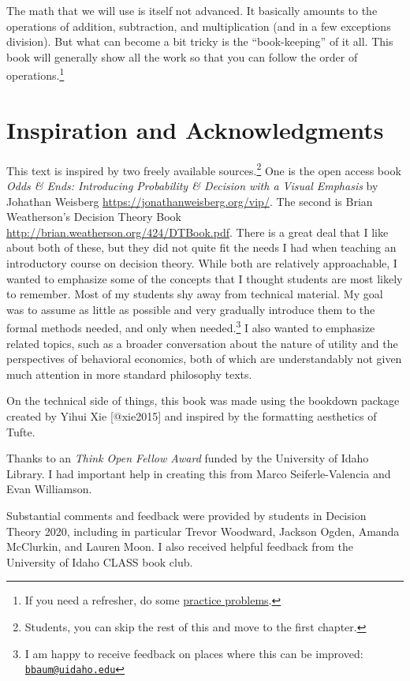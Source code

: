 \documentclass[]{tufte-book}
\begin{document}
The math that we will use is itself not advanced. It basically amounts to the operations of addition, subtraction, and multiplication (and in a few exceptions division). But what can become a bit tricky is the ``book-keeping'' of it all. This book will generally show all the work so that you can follow the order of operations.\footnote{If you need a refresher, do some \href{https://g.co/kgs/mhz72v}{practice problems}.}

\hypertarget{inspiration-and-acknowledgments}{%
\section{Inspiration and Acknowledgments}\label{inspiration-and-acknowledgments}}

This text is inspired by two freely available sources.\footnote{Students, you can skip the rest of this and move to the first chapter.} One is the open access book \emph{Odds \& Ends: Introducing Probability \& Decision with a Visual Emphasis} by Johathan Weisberg \url{https://jonathanweisberg.org/vip/}. The second is Brian Weatherson's Decision Theory Book \url{http://brian.weatherson.org/424/DTBook.pdf}. There is a great deal that I like about both of these, but they did not quite fit the needs I had when teaching an introductory course on decision theory. While both are relatively approachable, I wanted to emphasize some of the concepts that I thought students are most likely to remember. Most of my students shy away from technical material. My goal was to assume as little as possible and very gradually introduce them to the formal methods needed, and only when needed.\footnote{I am happy to receive feedback on places where this can be improved: \href{mailto:bbaum@uidaho.edu}{\nolinkurl{bbaum@uidaho.edu}}} I also wanted to emphasize related topics, such as a broader conversation about the nature of utility and the perspectives of behavioral economics, both of which are understandably not given much attention in more standard philosophy texts.

On the technical side of things, this book was made using the bookdown package created by Yihui Xie {[}@xie2015{]} and inspired by the formatting aesthetics of Tufte.

Thanks to an \emph{Think Open Fellow Award} funded by the University of Idaho Library. I had important help in creating this from Marco Seiferle-Valencia and Evan Williamson.

Substantial comments and feedback were provided by students in Decision Theory 2020, including in particular Trevor Woodward, Jackson Ogden, Amanda McClurkin, and Lauren Moon. I also received helpful feedback from the University of Idaho CLASS book club.
\end{document}
